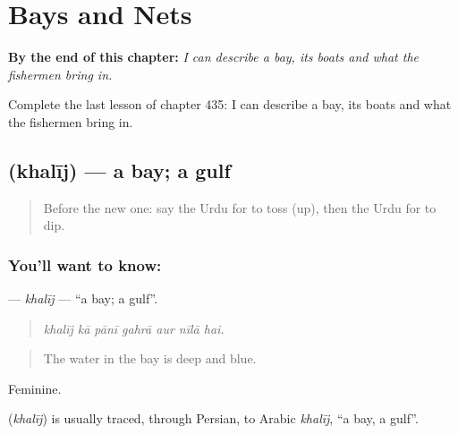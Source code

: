 
\chapter{Bays and Nets}
\label{ch:ur-bays-and-nets}

\begin{chapteropening}
\textbf{By the end of this chapter:} \emph{I can describe a bay, its boats and what the fishermen bring in.}

Complete the last lesson of chapter 435: I can describe a bay, its boats and what the fishermen bring in.
\end{chapteropening}

\section[\texorpdfstring{\ur{خلیج} (khalīj)}{خلیج (khalīj)}]{ (khalīj) — a bay; a gulf}

\label{lesson:UR-C435-khalij}



\begin{quote}
Before the new one: say the Urdu for to toss (up), then the Urdu for to dip.
\end{quote}

\subsection*{You'll want to know: }
\textbf{} — \emph{khalīj} — \textquotedblleft{}a bay; a gulf\textquotedblright{}.

\begin{quote}
      
\end{quote}

\begin{quote}
\emph{khalīj kā pānī gahrā aur nīlā hai.}
\end{quote}

\begin{quote}
The water in the bay is deep and blue.
\end{quote}

Feminine.

\begin{cousinweb}
\textbf{} (\emph{khalīj}) is usually traced, through Persian, to Arabic \emph{khalīj}, \textquotedblleft{}a bay, a gulf\textquotedblright{}.
\end{cousinweb}

